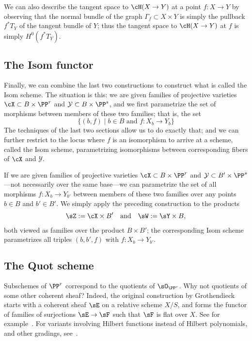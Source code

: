 We can also describe the tangent space to $\cH(X \to Y)$ at a point $f : X \to Y$ by observing that the normal bundle of the graph $\Gamma_f \subset X \times Y$ is simply the pullback $f^*T_Y$ of the tangent bundle of $Y$; thus the tangent space to $\cH(X \to Y)$ at $f$ is simply $H^0(f^*T_Y)$.

\subsection{The Isom functor}\label{Isom}
Finally, we can combine the last two constructions
 to construct what is called the Isom scheme. The situation is this: we are given families of projective varieties $\cX \subset B \times \PP^r$ and $\mathcal{Y} \subset B\times \PP^s$, and we first parametrize the set of morphisms between members of these two families; that is, the set
$$
\{ (b, f) \mid b \in B \text{ and } f: X_b \to Y_b \}
$$
The techniques of the last two sections allow us to do exactly that; and we can further restrict to the locus where $f$ is an isomorphism to arrive at a scheme, called the Isom scheme, parametrizing isomorphisms between corresponding fibers of $\cX$ and $\mathcal Y$.

If we are given families of projective varieties $\cX \subset B \times \PP^r$ and $\mathcal{Y} \subset B' \times \PP^s$---not necessarily over the same base---we can parametrize the set of all morphisms $f : X_b \to Y_{b'}$ between members of these two families over any points $b \in B$ and $b' \in B'$. We simply apply the preceding construction to the products
$$
\sZ := \cX \times B' \quad \text{and} \quad \sW : = \sY \times B,
$$
both viewed as families over the product $B \times B'$; the corresponding Isom scheme parametrizes all triples $(b, b', f)$ with $f : X_b \to Y_{b'}$.

\subsection{The Quot scheme} Subschemes of $\PP^{r}$ correspond to the quotients of $\sO_{\PP^{r}}$. Why not quotients of some other coherent sheaf? Indeed, the original construction by Grothendieck starts with a coherent sheaf $\sE$
on a relative scheme $X/S$, and forms the functor of families of surjections $\sE \to \sF$ such that $\sF$ is flat over $X$. See for example~\cite{MR2222646}.
 For variants involving Hilbert functions instead of Hilbert polynomials, and other gradings, see~\cite{MR2073194}.
 
